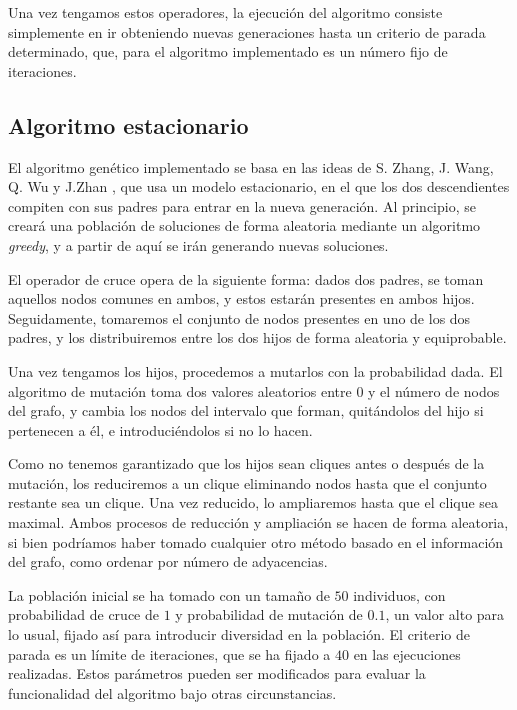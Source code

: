 Una vez tengamos estos operadores, la ejecución del algoritmo consiste simplemente
en ir obteniendo nuevas generaciones hasta un criterio de parada determinado,
que, para el algoritmo implementado es un número fijo de iteraciones.

\subsection{Algoritmo estacionario}\label{alg-genetico}

El algoritmo genético implementado se basa en las ideas de S. Zhang, J. Wang, Q. Wu
y J.Zhan \citep{zhang:2014}, que usa un modelo estacionario, en el que los dos
descendientes compiten con sus padres para entrar en la nueva generación.
Al principio, se creará una población de soluciones de forma aleatoria mediante
un algoritmo \textit{greedy}, y a partir de aquí se irán generando nuevas soluciones.

El operador de cruce opera de la siguiente forma: dados dos padres, se toman aquellos
nodos comunes en ambos, y estos estarán presentes en ambos hijos. Seguidamente,
tomaremos el conjunto de nodos presentes en uno de los dos padres, y los distribuiremos
entre los dos hijos de forma aleatoria y equiprobable.

Una vez tengamos los hijos, procedemos a mutarlos con la probabilidad dada. El
algoritmo de mutación toma dos valores aleatorios entre $0$ y el número de nodos
del grafo, y cambia los nodos del intervalo que forman, quitándolos del hijo si
pertenecen a él, e introduciéndolos si no lo hacen.

Como no tenemos garantizado que los hijos sean cliques antes o después de la mutación,
los reduciremos a un clique eliminando nodos hasta que el conjunto restante sea un
clique. Una vez reducido, lo ampliaremos hasta que el clique sea maximal.
Ambos procesos de reducción y ampliación se hacen de forma aleatoria, si bien
podríamos haber tomado cualquier otro método basado en el información del grafo,
como ordenar por número de adyacencias.

La población inicial se ha tomado con un tamaño de $50$ individuos, con probabilidad
de cruce de $1$ y probabilidad de mutación de $0.1$, un valor alto para lo usual,
fijado así para introducir diversidad en la población. El criterio de parada es un
límite de iteraciones, que se ha fijado a $40$ en las ejecuciones realizadas.
Estos parámetros pueden ser modificados para evaluar la funcionalidad del algoritmo
bajo otras circunstancias.

